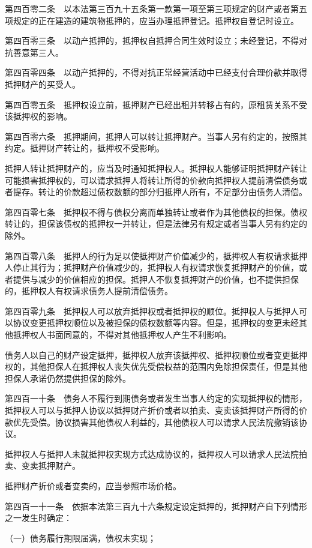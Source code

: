 \documentclass[UTF8,12pt,a4paper]{ctexbook}
\begin{document}
第四百零二条　以本法第三百九十五条第一款第一项至第三项规定的财产或者第五项规定的正在建造的建筑物抵押的，应当办理抵押登记。抵押权自登记时设立。

第四百零三条　以动产抵押的，抵押权自抵押合同生效时设立；未经登记，不得对抗善意第三人。

第四百零四条　以动产抵押的，不得对抗正常经营活动中已经支付合理价款并取得抵押财产的买受人。

第四百零五条　抵押权设立前，抵押财产已经出租并转移占有的，原租赁关系不受该抵押权的影响。

第四百零六条　抵押期间，抵押人可以转让抵押财产。当事人另有约定的，按照其约定。抵押财产转让的，抵押权不受影响。

抵押人转让抵押财产的，应当及时通知抵押权人。抵押权人能够证明抵押财产转让可能损害抵押权的，可以请求抵押人将转让所得的价款向抵押权人提前清偿债务或者提存。转让的价款超过债权数额的部分归抵押人所有，不足部分由债务人清偿。

第四百零七条　抵押权不得与债权分离而单独转让或者作为其他债权的担保。债权转让的，担保该债权的抵押权一并转让，但是法律另有规定或者当事人另有约定的除外。

第四百零八条　抵押人的行为足以使抵押财产价值减少的，抵押权人有权请求抵押人停止其行为；抵押财产价值减少的，抵押权人有权请求恢复抵押财产的价值，或者提供与减少的价值相应的担保。抵押人不恢复抵押财产的价值，也不提供担保的，抵押权人有权请求债务人提前清偿债务。

第四百零九条　抵押权人可以放弃抵押权或者抵押权的顺位。抵押权人与抵押人可以协议变更抵押权顺位以及被担保的债权数额等内容。但是，抵押权的变更未经其他抵押权人书面同意的，不得对其他抵押权人产生不利影响。

债务人以自己的财产设定抵押，抵押权人放弃该抵押权、抵押权顺位或者变更抵押权的，其他担保人在抵押权人丧失优先受偿权益的范围内免除担保责任，但是其他担保人承诺仍然提供担保的除外。

第四百一十条　债务人不履行到期债务或者发生当事人约定的实现抵押权的情形，抵押权人可以与抵押人协议以抵押财产折价或者以拍卖、变卖该抵押财产所得的价款优先受偿。协议损害其他债权人利益的，其他债权人可以请求人民法院撤销该协议。

抵押权人与抵押人未就抵押权实现方式达成协议的，抵押权人可以请求人民法院拍卖、变卖抵押财产。

抵押财产折价或者变卖的，应当参照市场价格。

第四百一十一条　依据本法第三百九十六条规定设定抵押的，抵押财产自下列情形之一发生时确定：

（一）债务履行期限届满，债权未实现；
\end{document}
